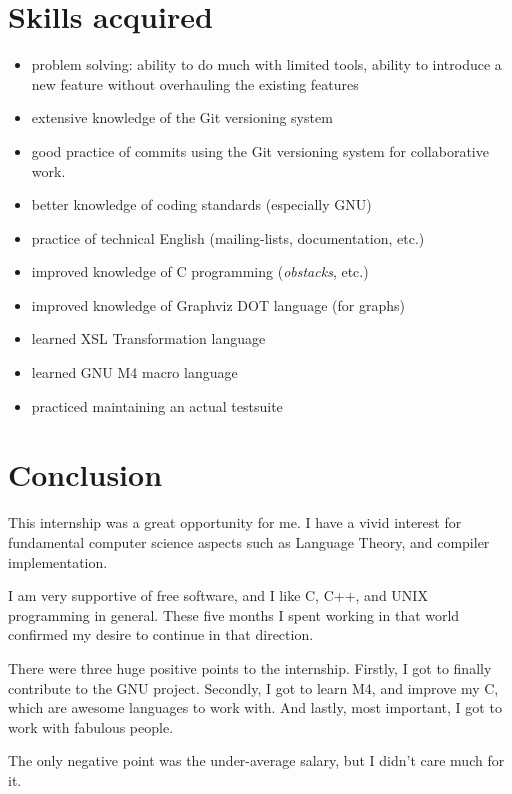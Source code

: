 \documentclass[a4paper,11pt,final]{article}
\begin{document}
  \section*{Skills acquired}

  \begin{itemize}
    \item problem solving: ability to do much with limited tools, ability to
      introduce a new feature without overhauling the existing features
    \item extensive knowledge of the Git versioning system
    \item good practice of commits using the Git versioning system for
      collaborative work.
    \item better knowledge of coding standards (especially GNU)
    \item practice of technical English (mailing-lists, documentation, etc.)
    \item improved knowledge of C programming (\textit{obstacks}, etc.)
    \item improved knowledge of Graphviz DOT language (for graphs)
    \item learned XSL Transformation language
    \item learned GNU M4 macro language
    \item practiced maintaining an actual testsuite
  \end{itemize}

  \section*{Conclusion}

  This internship was a great opportunity for me. I have a vivid interest for
  fundamental computer science aspects such as Language Theory, and compiler
  implementation. 

  I am very supportive of free software, and I like C, C++, and UNIX
  programming in general. These five months I spent working in that world
  confirmed my desire to continue in that direction.

  There were three huge positive points to the internship. Firstly, I got to
  finally contribute to the GNU project. Secondly, I got to learn M4, and
  improve my C, which are awesome languages to work with. And lastly, most
  important, I got to work with fabulous people.

  The only negative point was the under-average salary, but I didn't care much
  for it.
\end{document}
